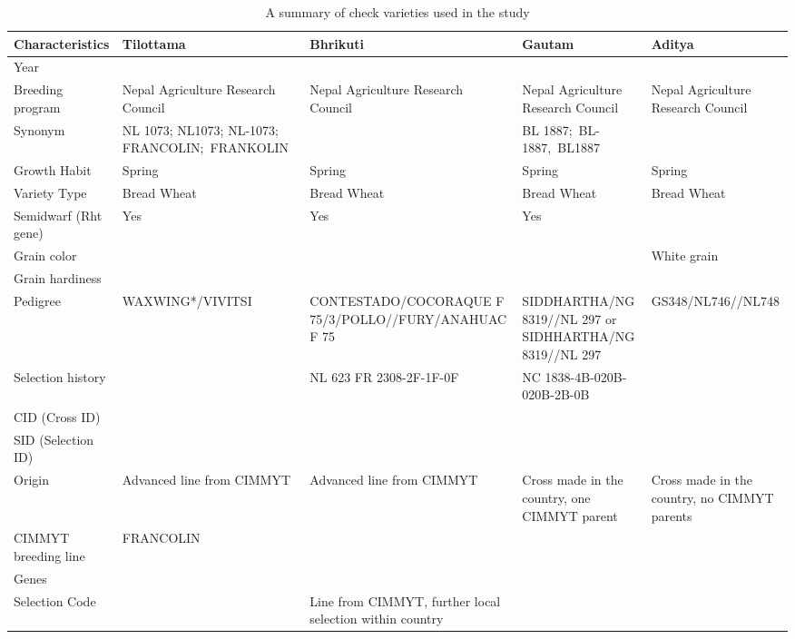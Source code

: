 \documentclass[12pt,oneside]{dukestatscithesis} %
\begin{document}
\begingroup\fontsize{8}{10}\selectfont
\begin{longtable}[t]{>{\centering\arraybackslash}p{2.0cm}>{\centering\arraybackslash}p{3.2cm}>{\centering\arraybackslash}p{3.2cm}>{\centering\arraybackslash}p{3.2cm}>{\centering\arraybackslash}p{3.2cm}}
\caption{\label{tab:check-vars-info}A summary of check varieties used in the study}\\
\toprule
Characteristics & Tilottama\footnotemark{}\strut \footnotetext{\url{http://wheatatlas.org/varieties/detail/26413}} & Bhrikuti\footnotemark{}\strut \footnotetext{\url{http://wheatatlas.org/varieties/detail/22378}} & Gautam\footnotemark{}\strut \footnotetext{\url{http://wheatatlas.org/varieties/detail/22383}} & Aditya\footnotemark{}\strut \footnotetext{\url{http://wheatatlas.org/varieties/detail/22373}}\\
\midrule
Year & 2014 & 1994 & 2002 & 2010\\
Breeding program & Nepal Agriculture Research Council & Nepal Agriculture Research Council & Nepal Agriculture Research Council & Nepal Agriculture Research Council\\
Synonym & NL 1073; NL1073; NL-1073; FRANCOLIN; FRANKOLIN  &  & BL 1887; BL-1887, BL1887 & \\
Growth Habit & Spring & Spring & Spring & Spring\\
Variety Type & Bread Wheat & Bread Wheat & Bread Wheat & Bread Wheat\\
\addlinespace
Semidwarf (Rht gene) & Yes & Yes & Yes & \\
Grain color &  &  &  & White grain\\
Grain hardiness &  &  &  & \\
Pedigree & WAXWING*\-2/VIVITSI & CONTESTAD\-O/COCORAQUE F 75/3/POLLO//F\-URY/ANAHUAC F 75 & SIDDHARTHA/NG 8319//NL 297 or SIDHHARTHA/NG 8319//NL 297  & GS348/NL746//NL748\\
Selection history &  & NL 623 FR 2308-2F-1F-0F & NC 1838-4B-020B-020B-2B-0B & \\
\addlinespace
CID (Cross ID) &  & 251774 &  & \\
SID (Selection ID) &  & 0 &  & \\
Origin & Advanced line from CIMMYT & Advanced line from CIMMYT & Cross made in the country, one CIMMYT parent & Cross made in the country, no CIMMYT parents\\
CIMMYT breeding line & FRANCOLIN &  &  & \\
Genes &  &  &  & \\
\addlinespace
Selection Code &  & Line from CIMMYT, further local selection within country &  & \\

\end{longtable}
\end{document}
